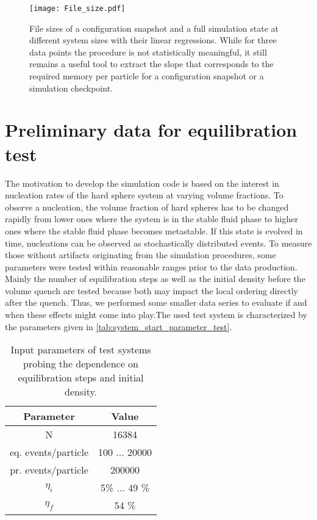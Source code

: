 \begin{figure}[h!]
\centering
\texttt{[image: File\_size.pdf]}
\caption[File size estimate of the simulation]{File sizes of a configuration snapshot and a full simulation state at different system sizes with their linear regressions. While for three data points the procedure is not statistically meaningful, it still remains a useful tool to extract the slope that corresponds to the required memory per particle for a configuration snapshot or a simulation checkpoint.}
\label{fig:file_size}
\end{figure}

\section{Preliminary data for equilibration test}
\label{sec:data}
The motivation to develop the simulation code is based on the interest in nucleation rates of the hard sphere system at varying volume fractions. To observe a nucleation, the volume fraction of hard spheres has to be changed rapidly from lower ones where the system is in the stable fluid phase to higher ones where the stable fluid phase becomes metastable. If this state is evolved in time, nucleations can be observed as stochastically distributed events. To measure those without artifacts originating from the simulation procedures, some parameters were tested within reasonable ranges prior to the data production.\\
Mainly the number of equilibration steps as well as the initial density before the volume quench are tested because both may impact the local ordering directly after the quench. Thus, we performed some smaller data series to evaluate if and when these effects might come into play.The used test system is characterized by the parameters given in \autoref{tab:system_start_parameter_test}.\\

\begin{table}
\centering
\begin{tabular}{c|c}
Parameter & Value \\ \hline
N & 16384 \\
eq. events/particle & 100 ... 20000 \\
pr. events/particle & 200000 \\
$\eta_i$ & 5\% ... 49 \% \\
$\eta_f$ & 54 \% \\
\end{tabular}
\caption[Simulation parameters for testing equilibration step number and initial density]{Input parameters of test systems probing the dependence on equilibration steps and initial density.}
\label{tab:system_start_parameter_test}
\end{table}

